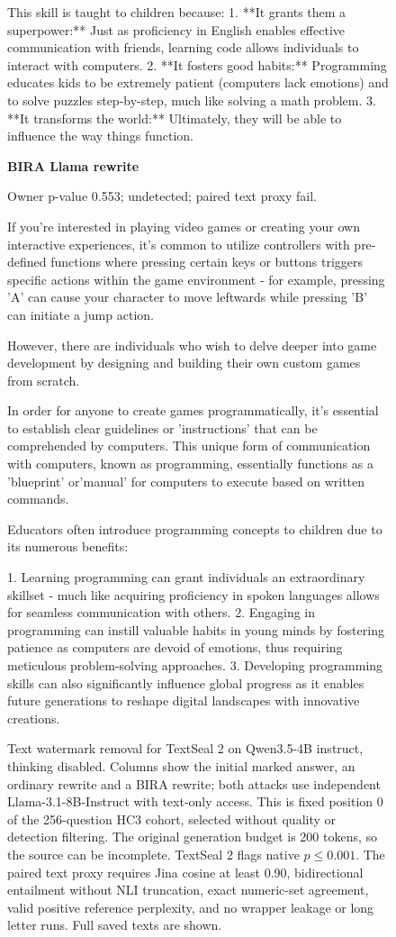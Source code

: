 \begin{figure}[p]
\begin{minipage}[t]{.315\linewidth}
This skill is taught to children because:
1.  **It grants them a superpower:** Just as proficiency in English enables effective communication with friends, learning code allows individuals to interact with computers.
2.  **It fosters good habits:** Programming educates kids to be extremely patient (computers lack emotions) and to solve puzzles step-by-step, much like solving a math problem.
3.  **It transforms the world:** Ultimately, they will be able to influence the way things function.
\end{minipage}
\hfill
\begin{minipage}[t]{.315\linewidth}\raggedright\footnotesize
\textbf{BIRA Llama rewrite}\par\smallskip
Owner p-value 0.553; undetected; paired text proxy fail.\par\medskip
If you're interested in playing video games or creating your own interactive experiences, it's common to utilize controllers with pre-defined functions where pressing certain keys or buttons triggers specific actions within the game environment - for example, pressing 'A' can cause your character to move leftwards while pressing 'B' can initiate a jump action.

However, there are individuals who wish to delve deeper into game development by designing and building their own custom games from scratch. 

In order for anyone to create games programmatically, it's essential to establish clear guidelines or 'instructions' that can be comprehended by computers. This unique form of communication with computers, known as programming, essentially functions as a 'blueprint' or'manual' for computers to execute based on written commands.

Educators often introduce programming concepts to children due to its numerous benefits:

1.  Learning programming can grant individuals an extraordinary skillset - much like acquiring proficiency in spoken languages allows for seamless communication with others.
2.  Engaging in programming can instill valuable habits in young minds by fostering patience as computers are devoid of emotions, thus requiring meticulous problem-solving approaches.
3.  Developing programming skills can also significantly influence global progress as it enables future generations to reshape digital landscapes with innovative creations.
\end{minipage}
\caption{Text watermark removal for TextSeal 2 on Qwen3.5-4B instruct, thinking disabled. Columns show the initial marked answer, an ordinary rewrite and a BIRA rewrite; both attacks use independent Llama-3.1-8B-Instruct with text-only access. This is fixed position 0 of the 256-question HC3 cohort, selected without quality or detection filtering. The original generation budget is 200 tokens, so the source can be incomplete. TextSeal 2 flags native $p\leq0.001$. The paired text proxy requires Jina cosine at least 0.90, bidirectional entailment without NLI truncation, exact numeric-set agreement, valid positive reference perplexity, and no wrapper leakage or long letter runs. Full saved texts are shown.}
\label{fig:watermark-text-textseal2}
\end{figure}
